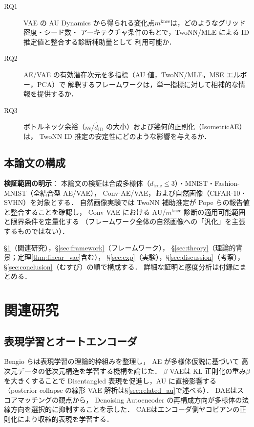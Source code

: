 \documentclass[11pt,a4paper]{jsarticle}
\newcommand{\mknee}{m^{\mathrm{knee}}}
\begin{document}
\begin{description}
  \item[RQ1] VAE の AU Dynamics から得られる変化点$\mknee$は，どのようなグリッド密度・シード数・
             アーキテクチャ条件のもとで，TwoNN/MLE による ID 推定値と整合する診断補助量として
             利用可能か．
  \item[RQ2] AE/VAE の有効潜在次元を多指標（AU 値，TwoNN/MLE，MSE エルボー，PCA）で
             解釈するフレームワークは，単一指標に対して相補的な情報を提供するか．
  \item[RQ3] ボトルネック余裕（$m / \hat{d}_\mathrm{ID}$ の大小）および幾何的正則化（IsometricAE）は，
             TwoNN ID 推定の安定性にどのような影響を与えるか．
\end{description}

\subsection{本論文の構成}\label{sec:intro_structure}

\textbf{検証範囲の明示}：
本論文の検証は合成多様体（$d_{\mathrm{true}} \leq 3$）・MNIST・Fashion-MNIST（全結合型 AE/VAE），
Conv-AE/VAE，および自然画像（CIFAR-10・SVHN）を対象とする．
自然画像実験では TwoNN 補助推定が Pope ら\cite{pope2021intrinsic}の報告値と整合することを確認し，
Conv-VAE における AU/$\mknee$ 診断の適用可能範囲と限界条件を定量化する
（フレームワーク全体の自然画像への「汎化」を主張するものではない）．

§\ref{sec:related}（関連研究），§\ref{sec:framework}（フレームワーク），
§\ref{sec:theory}（理論的背景；定理\ref{thm:linear_vae}含む），
§\ref{sec:exp}（実験），§\ref{sec:discussion}（考察），§\ref{sec:conclusion}（むすび）の順で構成する．
詳細な証明と感度分析は付録にまとめる．

\section{関連研究}\label{sec:related}

\subsection{表現学習とオートエンコーダ}\label{sec:related_ae}

Bengio ら\cite{bengio2013representation}は表現学習の理論的枠組みを整理し，
AE が多様体仮説\cite{fefferman2016manifold}に基づいて
高次元データの低次元構造を学習する機構を論じた．
$\beta$-VAE\cite{higgins2017betavae}は KL 正則化の重み$\beta$を大きくすることで
Disentangled 表現を促進し，AU に直接影響する
（posterior collapse の線形 VAE 解析は§\ref{sec:related_au}で述べる）．
DAE\cite{alain2014dae}はスコアマッチングの観点から，
Denoising Autoencoder の再構成方向が多様体の法線方向を選択的に抑制することを示した．
CAE\cite{rifai2011cae}はエンコーダ側ヤコビアンの正則化により収縮的表現を学習する．
\end{document}
